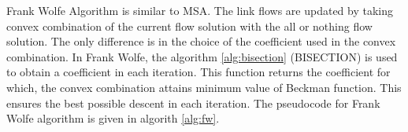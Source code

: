 Frank Wolfe Algorithm is similar to MSA. The link flows are
updated by taking convex combination of the current flow solution
with the all or nothing flow solution. The only difference is
in the choice of the coefficient used in the convex combination.
In Frank Wolfe, the algorithm \ref{alg:bisection} (BISECTION) is
used to obtain a coefficient in each iteration. This function returns
the coefficient for which, the convex combination attains minimum
value of Beckman function. This ensures the best possible descent
in each iteration. The pseudocode for Frank Wolfe algorithm is given
in algorith \ref{alg:fw}.



